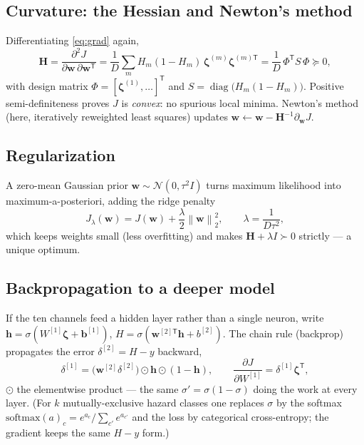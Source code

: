 \documentclass[11pt]{article}
\theoremstyle{definition}
\newcommand{\norm}[1]{\left\lVert #1 \right\rVert}
\newcommand{\diag}{\operatorname{diag}}
\newcommand{\T}{^{\mathsf{T}}}
\begin{document}
\subsection{Curvature: the Hessian and Newton's method}
Differentiating \eqref{eq:grad} again,
\begin{equation}
\mathbf H=\frac{\partial^2 J}{\partial\mathbf w\,\partial\mathbf w\T}
=\frac{1}{D}\sum_m H_m(1-H_m)\,\boldsymbol\zeta^{(m)}\boldsymbol\zeta^{(m)\mathsf T}
=\frac1D\,\Phi\T S\,\Phi\succeq 0,
\label{eq:hess}
\end{equation}
with design matrix $\Phi=[\boldsymbol\zeta^{(1)}\!,\dots]\T$ and
$S=\diag\big(H_m(1-H_m)\big)$. Positive semi-definiteness proves $J$ is
\emph{convex}: no spurious local minima. Newton's method (here, iteratively
reweighted least squares) updates $\mathbf w\leftarrow\mathbf w-\mathbf H^{-1}\partial_{\mathbf w}J$.

\subsection{Regularization}
A zero-mean Gaussian prior $\mathbf w\sim\mathcal N(0,\tau^2 I)$ turns maximum
likelihood into maximum-a-posteriori, adding the ridge penalty
\begin{equation}
J_\lambda(\mathbf w)=J(\mathbf w)+\frac{\lambda}{2}\norm{\mathbf w}_2^2,\qquad
\lambda=\frac{1}{D\tau^2},
\end{equation}
which keeps weights small (less overfitting) and makes $\mathbf H+\lambda I\succ0$
strictly --- a unique optimum.

\subsection{Backpropagation to a deeper model}
If the ten channels feed a hidden layer rather than a single neuron, write
$\mathbf h=\sigma(W^{[1]}\boldsymbol\zeta+\mathbf b^{[1]})$,
$H=\sigma(\mathbf w^{[2]\mathsf T}\mathbf h+b^{[2]})$. The chain rule (backprop)
propagates the error $\delta^{[2]}=H-y$ backward,
\begin{equation}
\delta^{[1]}=\big(\mathbf w^{[2]}\delta^{[2]}\big)\odot\mathbf h\odot(1-\mathbf h),\qquad
\frac{\partial J}{\partial W^{[1]}}=\delta^{[1]}\boldsymbol\zeta\T,
\end{equation}
$\odot$ the elementwise product --- the same $\sigma'=\sigma(1-\sigma)$ doing the
work at every layer. (For $k$ mutually-exclusive hazard classes one replaces
$\sigma$ by the softmax $\text{softmax}(a)_c=e^{a_c}/\sum_{c'}e^{a_{c'}}$ and the
loss by categorical cross-entropy; the gradient keeps the same $H-y$ form.)
\end{document}
